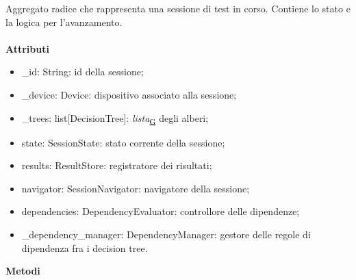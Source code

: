 \documentclass[a4paper,12pt]{article}
\begin{document}
                    Aggregato radice che rappresenta una sessione di test in corso. Contiene lo stato e la logica per l'avanzamento.\\\\
                    \textbf{Attributi}
                    \begin{itemize}
                        \item {\ttfamily \_id: String}: id della sessione;
                        \item {\ttfamily \_device: Device}: dispositivo associato alla sessione;
                        \item {\ttfamily \_trees: list[DecisionTree]}: \textit{lista}\textsubscript{\href{https://atlasteam9.github.io/Atlas/glossario.html\#Lista}{G}} degli alberi;
                        \item {\ttfamily state: SessionState}: stato corrente della sessione;
                        \item {\ttfamily results: ResultStore}: registratore dei risultati;
                        \item {\ttfamily navigator: SessionNavigator}: navigatore della sessione;
                        \item {\ttfamily dependencies: DependencyEvaluator}: controllore delle dipendenze;
                        \item {\ttfamily \_dependency\_manager: DependencyManager}: gestore delle regole di dipendenza fra i decision tree.
                    \end{itemize}
                    \textbf{Metodi}
\end{document}
